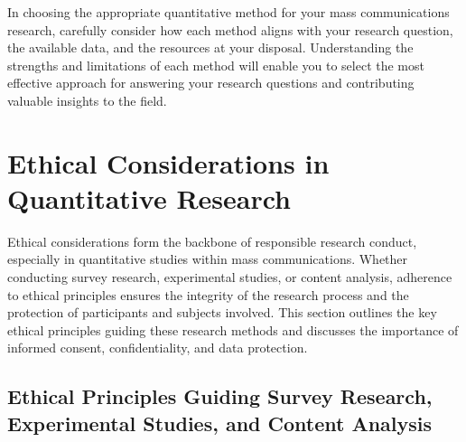 \documentclass[
]{book}
\begin{document}
In choosing the appropriate quantitative method for your mass communications research, carefully consider how each method aligns with your research question, the available data, and the resources at your disposal. Understanding the strengths and limitations of each method will enable you to select the most effective approach for answering your research questions and contributing valuable insights to the field.

\hypertarget{ethical-considerations-in-quantitative-research}{%
\section{Ethical Considerations in Quantitative Research}\label{ethical-considerations-in-quantitative-research}}

Ethical considerations form the backbone of responsible research conduct, especially in quantitative studies within mass communications. Whether conducting survey research, experimental studies, or content analysis, adherence to ethical principles ensures the integrity of the research process and the protection of participants and subjects involved. This section outlines the key ethical principles guiding these research methods and discusses the importance of informed consent, confidentiality, and data protection.

\hypertarget{ethical-principles-guiding-survey-research-experimental-studies-and-content-analysis}{%
\subsection*{Ethical Principles Guiding Survey Research, Experimental Studies, and Content Analysis}\label{ethical-principles-guiding-survey-research-experimental-studies-and-content-analysis}}
\end{document}
